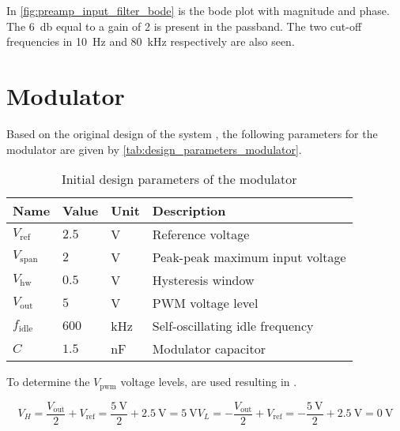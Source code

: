 In \autoref{fig:preamp_input_filter_bode} is the bode plot with magnitude and phase. The \SI{6}{\decibel} equal to a gain of 2 is present in the passband. The two cut-off frequencies in \SI{10}{\hertz} and \SI{80}{\kilo\hertz} respectively are also seen.

\section{Modulator}
Based on the original design of the system \cite{multivar_ctrl_loops_for_SM_audio_systems}, the following parameters for the modulator are given by \autoref{tab:design_parameters_modulator}.
\begin{table}[htbp]
	\centering
	\begin{tabular}{@{}llll@{}}
		\toprule
		\multicolumn{1}{c}{\textbf{Name}} & \textbf{Value} & \textbf{Unit} & \textbf{Description} \\ \midrule
		$V_{\mathrm{ref}}$ & $2.5$ & \si{\volt} & Reference voltage \\
		$V_{\mathrm{span}}$ & $2$ & \si{\volt} & Peak-peak maximum input voltage \\
		$V_{\mathrm{hw}}$ & $0.5$  & \si{\volt}  & Hysteresis window \\
		$V_{\mathrm{out}}$ & $5$  & \si{\volt}  & PWM voltage level \\
		$f_{\mathrm{idle}}$ & $600$  & \si{\kilo\hertz}  & Self-oscillating idle frequency \\
		$C$  & $1.5$  & \si{\nano\farad}   & Modulator capacitor \\ \bottomrule
	\end{tabular}
	\caption{Initial design parameters of the modulator}
	\label{tab:design_parameters_modulator}
\end{table}

To determine the $V_{\mathrm{pwm}}$ voltage levels,  are used resulting in . 

\begin{subequations} \label{eq:pwm_states_synth}
	\begin{equation} \label{eq:pwm_states_synth_a}
		V_{H} = \frac{V_{\mathrm{out}}}{2} + V_{\mathrm{ref}} = \frac{\SI{5}{\volt}}{2} + \SI{2.5}{\volt} = \SI{5}{\volt}
	\end{equation}
	\begin{equation} \label{eq:pwm_states_synth_b}
		V_{L} = -\frac{V_{\mathrm{out}}}{2} + V_{\mathrm{ref}} = -\frac{\SI{5}{\volt}}{2} + \SI{2.5}{\volt} = \SI{0}{\volt}
	\end{equation}
\end{subequations}

